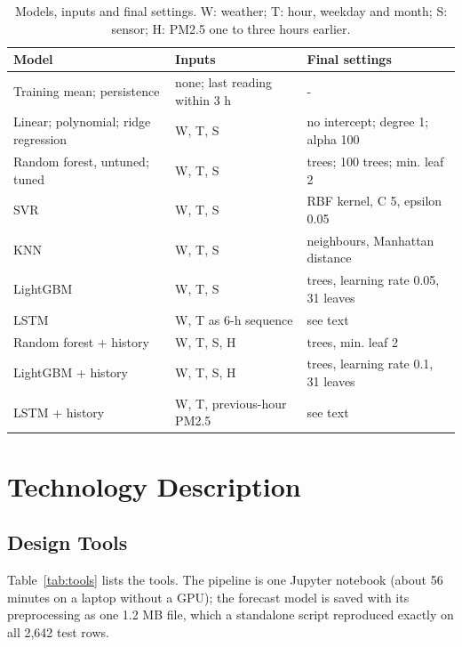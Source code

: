 \documentclass{ieeeaccess}
\begin{document}
\begin{table}[t]
\caption{Models, inputs and final settings. W: weather; T: hour, weekday and month; S: sensor; H: PM2.5 one to three hours earlier.}
\label{tab:models}
\centering
\footnotesize
\begin{tabularx}{\columnwidth}{>{\raggedright\arraybackslash}X>{\raggedright\arraybackslash}X>{\raggedright\arraybackslash}X}
\toprule
Model & Inputs & Final settings \\
\midrule
Training mean; persistence & none; last reading within 3 h & - \\
Linear; polynomial; ridge regression & W, T, S & no intercept; degree 1; alpha 100 \\
Random forest, untuned; tuned~\cite{ref17} & W, T, S & 200 trees; 100 trees; min. leaf 2 \\
SVR & W, T, S & RBF kernel, C 5, epsilon 0.05 \\
KNN & W, T, S & 5 neighbours, Manhattan distance \\
LightGBM~\cite{ref18} & W, T, S & 800 trees, learning rate 0.05, 31 leaves \\
LSTM & W, T as 6-h sequence & see text \\
Random forest + history & W, T, S, H & 200 trees, min. leaf 2 \\
LightGBM + history & W, T, S, H & 200 trees, learning rate 0.1, 31 leaves \\
LSTM + history & W, T, previous-hour PM2.5 & see text \\
\bottomrule
\end{tabularx}
\end{table}

\section{Technology Description}\label{sec:technology}

\subsection{Design Tools}\label{sec:design-tools}

Table~\ref{tab:tools} lists the tools. The pipeline is one Jupyter notebook (about 56 minutes on a laptop without a GPU); the forecast model is saved with its preprocessing as one 1.2 MB file, which a standalone script reproduced exactly on all 2,642 test rows.
\end{document}
